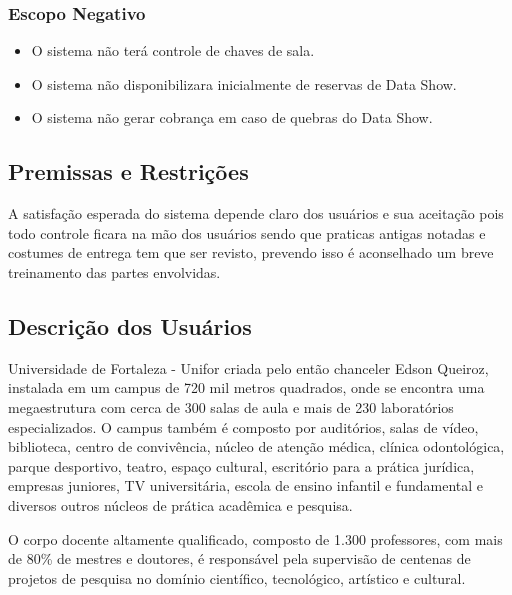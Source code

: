 \subsubsection{Escopo Negativo}

\begin{flushleft}
  
  \begin{itemize}
  
    \item O sistema não terá controle de chaves de sala. 

    \item O sistema não disponibilizara inicialmente de reservas de Data Show.

    \item O sistema não gerar cobrança em caso de quebras do Data Show.

  \end{itemize}

\end{flushleft}


\subsection{Premissas e Restrições}

A satisfação esperada do sistema depende claro dos usuários e sua aceitação pois
todo controle ficara na mão dos usuários sendo que praticas antigas notadas e
costumes de entrega tem que ser revisto, prevendo isso é aconselhado um breve
treinamento das partes envolvidas. 

\subsection{Descrição dos Usuários}

Universidade de Fortaleza - Unifor criada pelo então chanceler Edson Queiroz, 
instalada em um campus de 720 mil metros quadrados, onde se encontra uma 
megaestrutura com cerca de 300 salas de aula e mais de 230 laboratórios 
especializados. O campus também é composto por auditórios, salas de vídeo, 
biblioteca, centro de convivência, núcleo de atenção médica, clínica odontológica, 
parque desportivo, teatro, espaço cultural, escritório para a prática jurídica, 
empresas juniores, TV universitária, escola de ensino infantil e fundamental e 
diversos outros núcleos de prática acadêmica e pesquisa.

O corpo docente altamente qualificado, composto de 1.300 professores, com mais de 80\% de mestres e doutores, é responsável pela supervisão de centenas de projetos de pesquisa no domínio científico, tecnológico, artístico e cultural.

